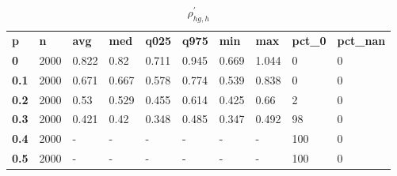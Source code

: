 \begin{table}[h]
 \centering 
\footnotesize
\caption{$\rho_{hg,h}^\prime $}
\label{tab:alphahgh}
\begin{tabular}[h]{| l l l l l l l l l l|
    } \hline
\textbf{ p} & \textbf{ n} & \textbf{ avg} & \textbf{ med} & \textbf{ q025} & \textbf{ q975} & \textbf{ min} & \textbf{ max} & \textbf{ pct\_0} & \textbf{ pct\_nan}
           \\
  \textbf{  0} & 2000 & 0.822 &  0.82 & 0.711 & 0.945 & 0.669 & 1.044 &   0 & 0
           \\
  \textbf{0.1} & 2000 & 0.671 & 0.667 & 0.578 & 0.774 & 0.539 & 0.838 &   0 & 0
           \\
  \textbf{0.2} & 2000 &  0.53 & 0.529 & 0.455 & 0.614 & 0.425 &  0.66 &   2 & 0
           \\
  \textbf{0.3} & 2000 & 0.421 &  0.42 & 0.348 & 0.485 & 0.347 & 0.492 &  98 & 0
           \\
  \textbf{0.4} & 2000 & - & - & - & - & - & - & 100 & 0
           \\
  \textbf{0.5} & 2000 & - & - & - & - & - & - & 100 & 0
           \\
 \hline \end{tabular}
 \end{table}
